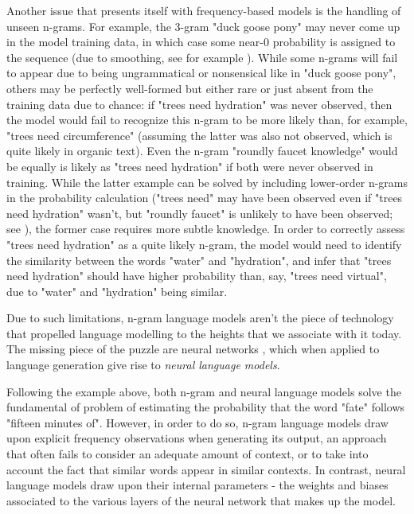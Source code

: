 Another issue that presents itself with frequency-based models is the handling of unseen n-grams. For example, the 3-gram "duck goose pony" may never come up in the model training data, in which case some near-0 probability is assigned to the sequence (due to smoothing, see for example \citealp{chen1999empirical}).
While some n-grams will fail to appear due to being ungrammatical or nonsensical like in "duck goose pony", others may be perfectly well-formed but either rare or just absent from the training data due to chance: if "trees need hydration" was never observed, then the model would fail to recognize this n-gram to be more likely than, for example, "trees need circumference" (assuming the latter was also not observed, which is quite likely in organic text).
Even the n-gram "roundly faucet knowledge" would be equally is likely as "trees need hydration" if both were never observed in training. While the latter example can be solved by including lower-order n-grams in the probability calculation ("trees need" may have been observed even if "trees need hydration" wasn't, but "roundly faucet" is unlikely to have been observed; see \citealp{katz1987estimation}), the former case requires more subtle knowledge.
In order to correctly assess "trees need hydration" as a quite likely n-gram, the model would need to identify the similarity between the words "water" and "hydration", and infer that "trees need hydration" should have higher probability than, say, "trees need virtual", due to "water" and "hydration" being similar.

Due to such limitations, n-gram language models aren't the piece of technology that propelled language modelling to the heights that we associate with it today.
The missing piece of the puzzle are neural networks \citep{anderson1995introduction}, which when applied to language generation give rise to \emph{neural language models}.

Following the example above, both n-gram and neural language models solve the fundamental of problem of estimating the probability that the word "fate" follows "fifteen minutes of".
However, in order to do so, n-gram language models draw upon explicit frequency observations when generating its output, an approach that often fails to consider an adequate amount of context, or to take into account the fact that similar words appear in similar contexts.
In contrast, neural language models draw upon their internal parameters - the weights and biases \citep{anderson1995introduction} associated to the various layers of the neural network that makes up the model.

